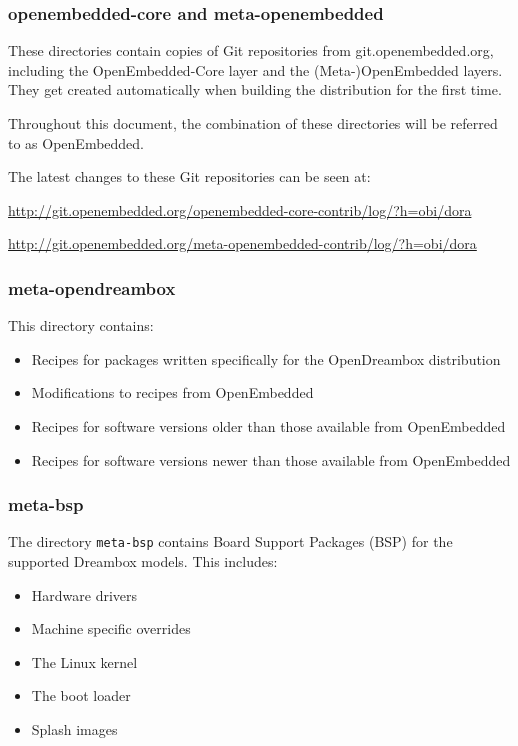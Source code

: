 \documentclass[a4paper]{article}
\newcommand{\shell}[1]{\texttt{\small #1}}
\begin{document}
    \subsubsection{openembedded-core and meta-openembedded}
       These directories contain copies of Git repositories from git.openembedded.org,
       including the OpenEmbedded-Core layer and the (Meta-)OpenEmbedded layers. They
       get created automatically when building the distribution for the first time.

       Throughout this document, the combination of these directories will be
       referred to as OpenEmbedded.

       The latest changes to these Git repositories can be seen at:

       \url{http://git.openembedded.org/openembedded-core-contrib/log/?h=obi/dora}

       \url{http://git.openembedded.org/meta-openembedded-contrib/log/?h=obi/dora}

    \subsubsection{meta-opendreambox}
      This directory contains:

      \begin{itemize}
        \item Recipes for packages written specifically for the OpenDreambox distribution
        \item Modifications to recipes from OpenEmbedded
        \item Recipes for software versions older than those available from OpenEmbedded
        \item Recipes for software versions newer than those available from OpenEmbedded
      \end{itemize}

    \subsubsection{meta-bsp}
      The directory \shell{meta-bsp} contains Board Support Packages (BSP)
      for the supported Dreambox models. This includes:

      \begin{itemize}
        \item Hardware drivers
        \item Machine specific overrides
        \item The Linux kernel
        \item The boot loader
        \item Splash images
      \end{itemize}
\end{document}
